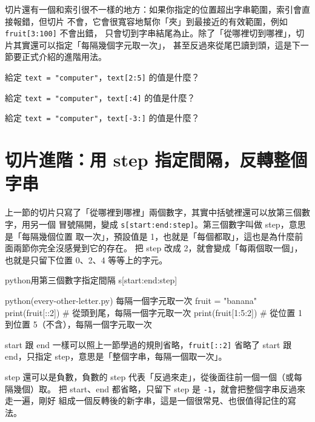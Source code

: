 切片還有一個和索引很不一樣的地方：如果你指定的位置超出字串範圍，索引會直接報錯，但切片
不會，它會很寬容地幫你「夾」到最接近的有效範圍，例如 \texttt{fruit[3:100]} 不會出錯，
只會切到字串結尾為止。除了「從哪裡切到哪裡」，切片其實還可以指定「每隔幾個字元取一次」，
甚至反過來從尾巴讀到頭，這是下一節要正式介紹的進階用法。

\begin{drills}[label=drills:string-slicing]
\item 給定 \texttt{text = "computer"}，\texttt{text[2:5]} 的值是什麼？
\item 給定 \texttt{text = "computer"}，\texttt{text[:4]} 的值是什麼？
\item 給定 \texttt{text = "computer"}，\texttt{text[-3:]} 的值是什麼？
\end{drills}

\section{切片進階：用 step 指定間隔，反轉整個字串}
\label{sec:string-slicing-step}

上一節的切片只寫了「從哪裡到哪裡」兩個數字，其實中括號裡還可以放第三個數字，用另一個
冒號隔開，變成 \texttt{s[start:end:step]}。第三個數字叫做 step，意思是「每隔幾個位置
取一次」，預設值是 1，也就是「每個都取」，這也是為什麼前面兩節你完全沒感覺到它的存在。
把 step 改成 2，就會變成「每兩個取一個」，也就是只留下位置 0、2、4 等等上的字元。

\begin{code}{python}{用第三個數字指定間隔}
s[start:end:step]
\end{code}

\begin{example}{python}{(every-other-letter.py) 每隔一個字元取一次}
fruit = "banana"
print(fruit[::2])     # 從頭到尾，每隔一個字元取一次
print(fruit[1:5:2])   # 從位置 1 到位置 5（不含），每隔一個字元取一次
\end{example}


start 跟 end 一樣可以照上一節學過的規則省略，\texttt{fruit[::2]} 省略了 start 跟
end，只指定 step，意思是「整個字串，每隔一個取一次」。

step 還可以是負數，負數的 step 代表「反過來走」，從後面往前一個一個（或每隔幾個）取。
把 start、end 都省略，只留下 step 是 \texttt{-1}，就會把整個字串反過來走一遍，剛好
組成一個反轉後的新字串，這是一個很常見、也很值得記住的寫法。

